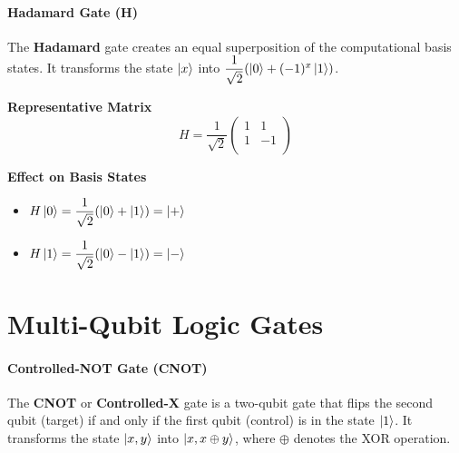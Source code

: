 \paragraph{Hadamard Gate (H)}

The \textbf{Hadamard} gate creates an equal superposition of the computational basis states. It transforms the state $\ket{x}$ into $\dfrac{1}{\sqrt{2}} (\ket{0} + (-1)^x \ket{1})$.

\vspace{0.5em}
\begin{minipage}{\textwidth}
    \begin{minipage}[t]{0.45\textwidth}
        \centering
        \textbf{Representative Matrix}\\[0.5em]
        \[
        H = \dfrac{1}{\sqrt{2}}
        \begin{pmatrix}
        1 & 1 \\
        1 & -1 \\
        \end{pmatrix}
        \]
    \end{minipage}
    \hfill
    \begin{minipage}[t]{0.45\textwidth}
        \centering
        \textbf{Effect on Basis States}\\[0.5em]
        \begin{itemize}
            \item $H\ket{0} = \dfrac{1}{\sqrt{2}} (\ket{0} + \ket{1}) = \ket{+}$
            \item $H\ket{1} = \dfrac{1}{\sqrt{2}} (\ket{0} - \ket{1}) = \ket{-}$
        \end{itemize}
    \end{minipage}
\end{minipage}

\section{Multi-Qubit Logic Gates}

\paragraph{Controlled-NOT Gate (CNOT)}

The \textbf{CNOT} or \textbf{Controlled-X} gate is a two-qubit gate that flips the second qubit (target) if and only if the first qubit (control) is in the state $\ket{1}$. It transforms the state $\ket{x, y}$ into $\ket{x, x \oplus y}$, where $\oplus$ denotes the XOR operation.

